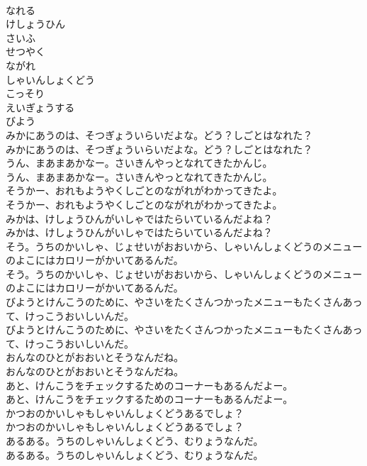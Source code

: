 \documentclass[8pt]{extreport}
\begin{document}
\begin{CJK}{UTF8}{min}
\\	なれる
\\	けしょうひん
\\	さいふ
\\	せつやく
\\	ながれ
\\	しゃいんしょくどう
\\	こっそり
\\	えいぎょうする
\\	びよう
\\	みかにあうのは、そつぎょういらいだよな。どう？しごとはなれた？
\\	みかにあうのは、そつぎょういらいだよな。どう？しごとはなれた？
\\	うん、まあまあかなー。さいきんやっとなれてきたかんじ。
\\	うん、まあまあかなー。さいきんやっとなれてきたかんじ。
\\	そうかー、おれもようやくしごとのながれがわかってきたよ。
\\	そうかー、おれもようやくしごとのながれがわかってきたよ。
\\	みかは、けしょうひんがいしゃではたらいているんだよね？
\\	みかは、けしょうひんがいしゃではたらいているんだよね？
\\	そう。うちのかいしゃ、じょせいがおおいから、しゃいんしょくどうのメニューのよこにはカロリーがかいてあるんだ。
\\	そう。うちのかいしゃ、じょせいがおおいから、しゃいんしょくどうのメニューのよこにはカロリーがかいてあるんだ。
\\	びようとけんこうのために、やさいをたくさんつかったメニューもたくさんあって、けっこうおいしいんだ。
\\	びようとけんこうのために、やさいをたくさんつかったメニューもたくさんあって、けっこうおいしいんだ。
\\	おんなのひとがおおいとそうなんだね。
\\	おんなのひとがおおいとそうなんだね。
\\	あと、けんこうをチェックするためのコーナーもあるんだよー。
\\	あと、けんこうをチェックするためのコーナーもあるんだよー。
\\	かつおのかいしゃもしゃいんしょくどうあるでしょ？
\\	かつおのかいしゃもしゃいんしょくどうあるでしょ？
\\	あるある。うちのしゃいんしょくどう、むりょうなんだ。
\\	あるある。うちのしゃいんしょくどう、むりょうなんだ。

\end{CJK}
\end{document}
